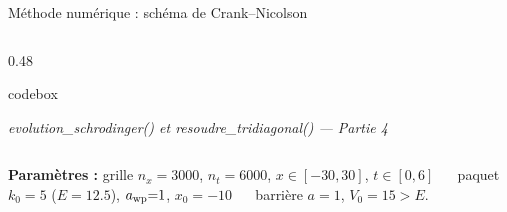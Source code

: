 \documentclass[10pt,aspectratio=169]{beamer}
\newcommand{\codesource}[1]{{\tiny\color{grisdoux}\textit{#1}}}
\begin{document}
\begin{frame}[fragile]{Méthode numérique : schéma de Crank--Nicolson}
\begin{columns}[T]
\begin{column}{0.48\textwidth}
\begin{tcblisting}{codebox}
      \end{tcblisting}
      \endgroup
      \codesource{evolution\_schrodinger() et resoudre\_tridiagonal() --- Partie 4}
    \end{column}
  \end{columns}
  \vspace{-0.05em}
  {\scriptsize\textbf{Paramètres :}
   grille $n_x{=}3000$, $n_t{=}6000$, $x{\in}[-30,30]$, $t{\in}[0,6]$ ~~
   paquet $k_0{=}5$ ($E{=}12.5$), $a_{\rm wp}{=}1$, $x_0{=}-10$ ~~
   barrière $a{=}1$, $V_0{=}15{>}E$.}
\end{frame}
\end{document}
